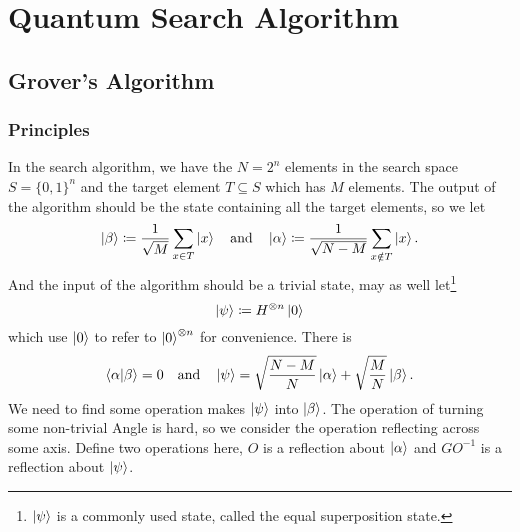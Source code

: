 \documentclass[a4paper,10pt]{article}
\numberwithin{equation}{subsection}
\begin{document}
\section{Quantum Search Algorithm}

\subsection{Grover's Algorithm}

\subsubsection{Principles}

In the search algorithm, we have the $N=2^{n}$ elements in the search space $S=\{0,1\}^{n}$ and the target element $T\subseteq S$ which has $M$ elements. The output of the algorithm should be the state containing all the target elements, so we let
\begin{equation}
    \ket{\beta}\coloneqq\frac{1}{\sqrt{M}}\sum_{x\in T}\ket{x}
    \quad\text{and}\quad
    \ket{\alpha}\coloneqq\frac{1}{\sqrt{N-M}}\sum_{x\notin T}\ket{x}.
\end{equation}
And the input of the algorithm should be a trivial state, may as well let\footnote{$\ket{\psi}$ is a commonly used state, called the equal superposition state.}
\begin{equation}
    \ket{\psi}\coloneqq H^{\otimes n}\ket{0}
\end{equation}
which use $\ket{0}$ to refer to $\ket{0}^{\otimes n}$ for convenience. There is
\begin{equation}
    \braket{\alpha|\beta}=0
    \quad\text{and}\quad
    \ket{\psi}=\sqrt{\frac{N-M}{N}}\ket{\alpha}+\sqrt{\frac{M}{N}}\ket{\beta}.
\end{equation}
We need to find some operation makes $\ket{\psi}$ into $\ket{\beta}$. The operation of turning some non-trivial Angle is hard, so we consider the operation reflecting across some axis. Define two operations here, $O$ is a reflection about $\ket{\alpha}$ and $GO^{-1}$ is a reflection about $\ket{\psi}$.
\begin{figure}[h]
    \centering
    \caption{}
    \label{fig:grover}
\end{figure}
\end{document}
